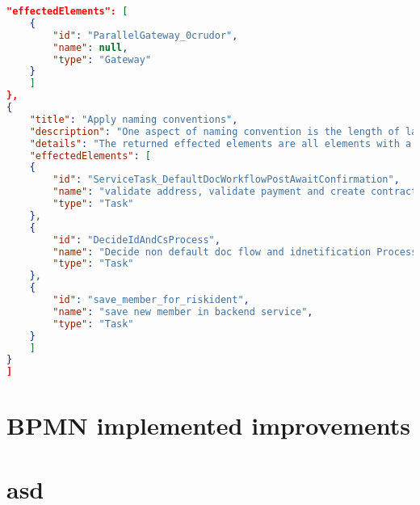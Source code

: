 \begin{lstlisting}[breaklines=true, language=json]
	"effectedElements": [
	{
		"id": "ParallelGateway_0crudor",
		"name": null,
		"type": "Gateway"
	}
	]
},
{
	"title": "Apply naming conventions",
	"description": "One aspect of naming convention is the length of labels, this rule scanns the bpmn for rlements with long labels (> 5 words)",
	"details": "The returned effected elements are all elements with a label that has more than 5 words",
	"effectedElements": [
	{
		"id": "ServiceTask_DefaultDocWorkflowPostAwaitConfirmation",
		"name": "validate address, validate payment and create contract",
		"type": "Task"
	},
	{
		"id": "DecideIdAndCsProcess",
		"name": "Decide non default doc flow and idnetification Process",
		"type": "Task"
	},
	{
		"id": "save_member_for_riskident",
		"name": "save new member in backend service",
		"type": "Task"
	}
	]
}
]
\end{lstlisting}


\section{BPMN implemented improvements}

\label{BPMN-after-naming}

\section{asd}
